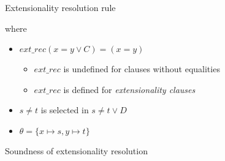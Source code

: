 \begin{frame}{Extensionality resolution rule}
  \begin{prooftree}
  \end{prooftree}

  where

  \begin{itemize}
  \item $ext\_rec(x = y \lor C) = (x = y)$
    
    \begin{itemize}
    \item $ext\_rec$ is undefined for clauses without equalities
    \item $ext\_rec$ is defined for \emph{extensionality clauses}
    \end{itemize}
    
  \item $s \neq t$ is selected in $s \neq t \lor D$
  \item $\theta = \{ x \mapsto s, y \mapsto t \}$
  \end{itemize}
\end{frame}

\begin{frame}{Soundness of extensionality resolution}
  \begin{prooftree}
  \end{prooftree}
\end{frame}


